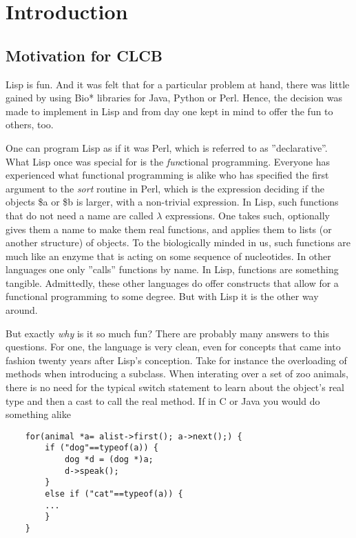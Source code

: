 \documentclass{book}
\begin{document}
\chapter{Introduction}



\section{Motivation for CLCB}

Lisp is fun. And it was felt that for a particular problem at hand, 
there was little gained by using Bio* libraries for Java, Python or Perl.
Hence, the decision was made to implement in Lisp and from day one kept in
mind to offer the fun to others, too.

One can program Lisp as if it was Perl, which is referred to as
''declarative''. What Lisp once was special for is the {\em fun}ctional
programming. Everyone has experienced what functional programming is alike
who has specified the first argument to the {\em sort} routine in Perl,
which is the expression deciding if the objects \$a or \$b is larger, with
a non-trivial expression.  In Lisp,
such functions that do not need a name are called $\lambda$ expressions.
One takes such, optionally gives them a name to make them real functions,
and applies them to lists (or another structure) of objects. To the biologically minded in us,
such functions are much like an enzyme that is acting on some sequence of
nucleotides. In other languages one only ''calls'' functions by name. In Lisp, functions are something tangible. Admittedly, these other languages do offer constructs that allow for a functional
programming to some degree. But with Lisp it is the other way around.

But exactly {\em why} is it so much fun? There are probably many answers
to this questions.  For one, the language is very clean, even for concepts
that came into fashion twenty years after Lisp's conception. Take
for instance the overloading of methods when introducing a subclass.
When interating over a set of zoo animals, there is no need for the
typical switch statement to learn about the object's real type and then a
cast to call the real method. If in C or Java you would do something alike

\lstset{language=C}
\begin{lstlisting}
	for(animal *a= alist->first(); a->next();) {
		if ("dog"==typeof(a)) {
			dog *d = (dog *)a;
			d->speak();
		}
		else if ("cat"==typeof(a)) {
		...
		}
	}
\end{lstlisting}
\end{document}
